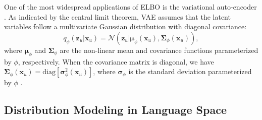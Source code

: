 \documentclass[sigconf]{acmart}
\begin{document}
One of the most widespread applications of ELBO is the variational auto-encoder \cite{kingma2013auto}. As indicated by the central limit theorem, VAE assumes that the latent variables follow a multivariate Gaussian distribution with diagonal covariance:
\begin{equation}
\label{vae_q}
q_{\phi}(\mathbf z_u|\mathbf x_u)=\mathcal N\left (\mathbf z_u|\boldsymbol\mu_\phi(\mathbf x_u), \boldsymbol\Sigma_{\phi}(\mathbf x_u)\right),
\end{equation}
where $\boldsymbol\mu_\phi$ and $\boldsymbol\Sigma_{\phi}$ are the non-linear mean and covariance functions parameterized by $\phi$, respectively. When the covariance matrix is diagonal, we have $\boldsymbol\Sigma_{\phi}(\mathbf x_u)=\text{diag}[\boldsymbol\sigma^2_{\phi}(\mathbf x_u)]$, where $\boldsymbol\sigma_\phi$ is the standard deviation parameterized by $\phi$ \cite{xu2020learning}. 

\subsection{Distribution Modeling in Language Space}
\end{document}
